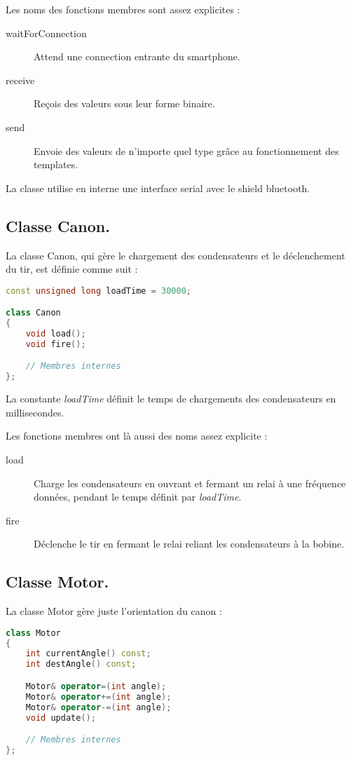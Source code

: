 Les noms des fonctions membres sont assez explicites :\begin{description}
	\item[waitForConnection] Attend une connection entrante du smartphone.
	\item[receive] Reçois des valeurs sous leur forme binaire.
	\item[send] Envoie des valeurs de n'importe quel type grâce au fonctionnement des templates.
\end{description}

La classe utilise en interne une interface serial avec le shield bluetooth.

\subsection{Classe Canon.} \label{ard_can}
La classe Canon, qui gère le chargement des condensateurs et le déclenchement du tir, est définie comme suit :
\begin{lstlisting}[language=C++]
const unsigned long loadTime = 30000;

class Canon
{
	void load();
	void fire();

	// Membres internes
};
\end{lstlisting}

La constante \emph{loadTime} définit le temps de chargements des condensateurs en millisecondes.

Les fonctions membres ont là aussi des noms assez explicite :\begin{description}
	\item[load] Charge les condensateurs en ouvrant et fermant un relai à une fréquence données, pendant le temps définit par \emph{loadTime}.
	\item[fire] Déclenche le tir en fermant le relai reliant les condensateurs à la bobine.
\end{description}

\subsection{Classe Motor.} \label{ard_mot}
La classe Motor gère juste l'orientation du canon :
\begin{lstlisting}[language=C++]
class Motor
{
	int currentAngle() const;
	int destAngle() const;

	Motor& operator=(int angle);
	Motor& operator+=(int angle);
	Motor& operator-=(int angle);
	void update();

	// Membres internes
};
\end{lstlisting}

